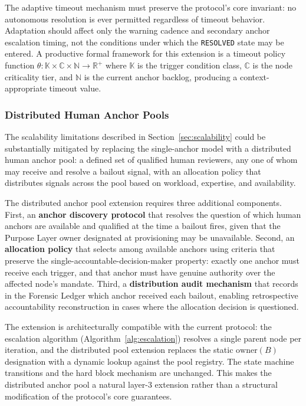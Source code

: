 \documentclass[12pt]{article}
\begin{document}
The adaptive timeout mechanism must preserve the protocol's core invariant: no autonomous resolution is ever permitted regardless of timeout behavior. Adaptation should affect only the warning cadence and secondary anchor escalation timing, not the conditions under which the \texttt{RESOLVED} state may be entered. A productive formal framework for this extension is a timeout policy function $\theta : \mathbb{K} \times \mathbb{C} \times \mathbb{N} \rightarrow \mathbb{R}^+$ where $\mathbb{K}$ is the trigger condition class, $\mathbb{C}$ is the node criticality tier, and $\mathbb{N}$ is the current anchor backlog, producing a context-appropriate timeout value.

\subsubsection{Distributed Human Anchor Pools}\label{sec:anchor-pools}

The scalability limitations described in Section~\ref{sec:scalability} could be substantially mitigated by replacing the single-anchor model with a distributed human anchor pool: a defined set of qualified human reviewers, any one of whom may receive and resolve a bailout signal, with an allocation policy that distributes signals across the pool based on workload, expertise, and availability.

The distributed anchor pool extension requires three additional components. First, an \textbf{anchor discovery protocol} that resolves the question of which human anchors are available and qualified at the time a bailout fires, given that the Purpose Layer owner designated at provisioning may be unavailable. Second, an \textbf{allocation policy} that selects among available anchors using criteria that preserve the single-accountable-decision-maker property: exactly one anchor must receive each trigger, and that anchor must have genuine authority over the affected node's mandate. Third, a \textbf{distribution audit mechanism} that records in the Forensic Ledger which anchor received each bailout, enabling retrospective accountability reconstruction in cases where the allocation decision is questioned.

The extension is architecturally compatible with the current protocol: the escalation algorithm (Algorithm~\ref{alg:escalation}) resolves a single parent node per iteration, and the distributed pool extension replaces the static $\text{owner}(B)$ designation with a dynamic lookup against the pool registry. The state machine transitions and the hard block mechanism are unchanged. This makes the distributed anchor pool a natural layer-3 extension rather than a structural modification of the protocol's core guarantees.
\end{document}
